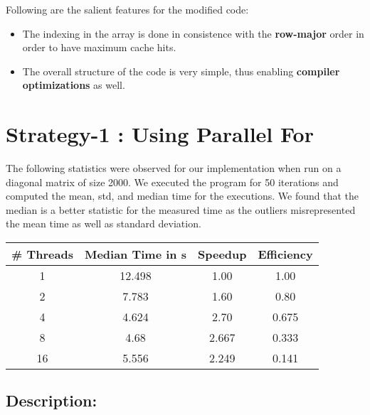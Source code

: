 \documentclass[12pt]{article}
\begin{document}
Following are the salient features for the modified code:
\begin{itemize}
  \item The indexing in the array is done in consistence with the \textbf{row-major} order in order to have maximum cache hits.
  \item The overall structure of the code is very simple, thus enabling \textbf{compiler optimizations} as well.
\end{itemize}

\section*{Strategy-1 : Using Parallel For}

  The following statistics were observed for our implementation when run on a diagonal matrix of size 2000. We executed the program for 50 iterations and computed the mean, std, and median time for the executions. We found that the median is a
  better statistic for the measured time as the outliers misrepresented the mean time as well as standard deviation.
  \begin{table}[h!]
    \begin{center}
      \begin{tabular}{|c|c|c|c|} %
      \hline
      \textbf{\# Threads} & \textbf{Median Time in s} & \textbf{Speedup} &\textbf{Efficiency}\\
        \hline  
        1 & 12.498& 1.00& 1.00\\
        2 & 7.783& 1.60& 0.80\\
        4 & 4.624 & 2.70 & 0.675\\
        8 & 4.68 & 2.667 & 0.333\\
        16 & 5.556 & 2.249& 0.141\\
        \hline
      \end{tabular}
    \end{center}
  \end{table}

\subsection*{Description:}
\end{document}
